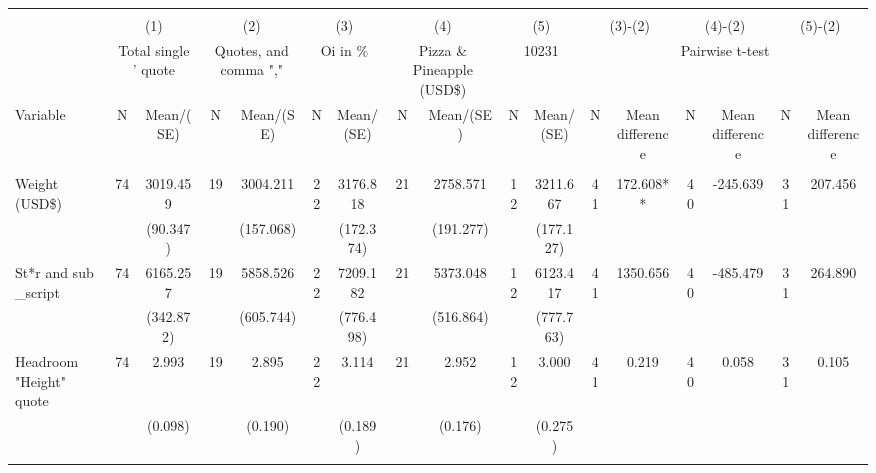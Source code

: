 
\begin{tabular}{@{\extracolsep{5pt}}lcccccccccccccccc}
\\[-1.8ex]\hline \hline \\[-1.8ex]
 & \multicolumn{2}{c}{(1)}  & \multicolumn{2}{c}{(2)}  & \multicolumn{2}{c}{(3)}  & \multicolumn{2}{c}{(4)}  & \multicolumn{2}{c}{(5)}  & \multicolumn{2}{c}{(3)-(2)} & \multicolumn{2}{c}{(4)-(2)} & \multicolumn{2}{c}{(5)-(2)} \\
 & \multicolumn{2}{c}{Total single ' quote}  & \multicolumn{2}{c}{Quotes, and comma ","}  & \multicolumn{2}{c}{Oi in \%}  & \multicolumn{2}{c}{Pizza \& Pineapple (USD\$)}  & \multicolumn{2}{c}{10231}  & \multicolumn{6}{c}{Pairwise t-test}  \\
Variable & N & Mean/(SE) & N & Mean/(SE) & N & Mean/(SE) & N & Mean/(SE) & N & Mean/(SE) & N & Mean difference & N & Mean difference & N & Mean difference \\ \hline \\[-1.8ex] 
Weight (USD\$)   & 74    & 3019.459    & 19    & 3004.211    & 22    & 3176.818    & 21    & 2758.571    & 12    & 3211.667    & 41    & 172.608**    & 40    & -245.639    & 31    & 207.456   \\
 &   & (90.347)  &   & (157.068)  &   & (172.374)  &   & (191.277)  &   & (177.127)  &   &  &   &  &   &  \\ [1ex]
St*r and sub \_script   & 74    & 6165.257    & 19    & 5858.526    & 22    & 7209.182    & 21    & 5373.048    & 12    & 6123.417    & 41    & 1350.656    & 40    & -485.479    & 31    & 264.890   \\
 &   & (342.872)  &   & (605.744)  &   & (776.498)  &   & (516.864)  &   & (777.763)  &   &  &   &  &   &  \\ [1ex]
Headroom "Height" quote   & 74    & 2.993    & 19    & 2.895    & 22    & 3.114    & 21    & 2.952    & 12    & 3.000    & 41    & 0.219    & 40    & 0.058    & 31    & 0.105   \\
 &   & (0.098)  &   & (0.190)  &   & (0.189)  &   & (0.176)  &   & (0.275)  &   &  &   &  &   &  \\ [1ex]
\hline \hline \\[-1.8ex]

\end{tabular}
